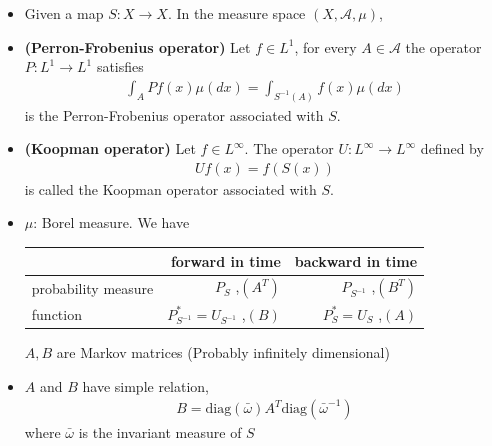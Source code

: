 \documentclass[12pt,t]{beamer}
\begin{document}
\begin{frame}
\begin{itemize}
\item Given a map $S:X \rightarrow X$. In the measure space $(X,\mathcal{A},\mu)$,
\item {\bfseries (Perron-Frobenius operator)}
Let $f \in L^1$, for every $A \in \mathcal{A}$ the operator $P:L^1 \rightarrow L^1$ satisfies
  \begin{eqnarray}
    \int_A Pf(x)\mu(dx) = \int_{S^{-1}(A)} f(x)\mu(dx)
  \end{eqnarray}
is the Perron-Frobenius operator associated with $S$.



\item {\bfseries (Koopman operator)}
Let $f \in L^\infty$. The operator $U:L^{\infty} \rightarrow L^{\infty} $ defined by
 \begin{eqnarray}
 Uf(x) = f(S(x))
 \end{eqnarray}
is called the Koopman operator associated with $S$.


\end{itemize}
\end{frame}

\begin{frame}
\begin{itemize}
\item $\mu$: Borel measure. We have
\begin{tabular}{l|rr}
                      & forward in time                    & backward in time     \\
\hline
        probability measure & $P_S$ ,$(A^T)$                       &  $P_{S^{-1}}$ ,$(B^T)$  \\
        function            & $P_{S^{-1}}^* = U_{S^{-1}}$ ,$(B)$ &  $P_S^* = U_S $ ,$(A)$
\end{tabular}

$A,B$ are Markov matrices (Probably infinitely dimensional)

\item $A$ and $B$ have simple relation,
      \begin{eqnarray}
         B = \text{diag}(\bar{\omega}) A^T \text{diag}({\bar{\omega}}^{-1})
       \end{eqnarray}
 where $\bar{\omega}$ is the invariant measure of $S$
\end{itemize}
\end{frame}
\end{document}
